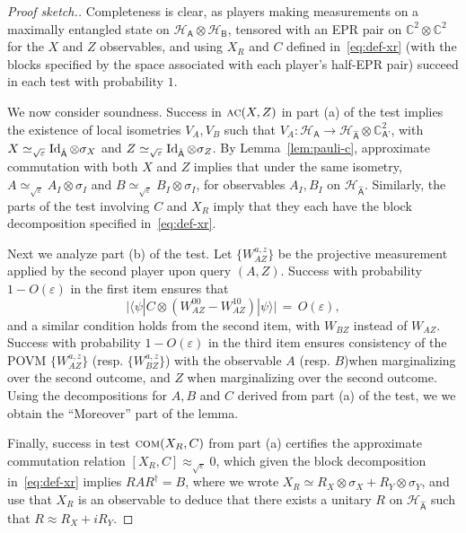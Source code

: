 \documentclass[11pt]{article}
\theoremstyle{remark}
\theoremstyle{definition}
\newcommand{\ket}[1]{|#1\rangle}
\newcommand{\bra}[1]{\langle#1|}
\newcommand{\Id}{\ensuremath{\mathop{\rm Id}\nolimits}}
\newcommand{\reg}[1]{{\textsf{#1}}}
\newcommand{\C}{\ensuremath{\mathbb{C}}}
\newcommand{\mH}{\mathcal{H}}
\newcommand{\eps}{\varepsilon}
\newcommand{\comt}{\textsc{com}}
\newcommand{\act}{\textsc{ac}}
\begin{document}
\begin{proof}[Proof sketch.]
Completeness is clear, as players making measurements on a maximally entangled state on $\mH_{\reg{A}}\otimes \mH_{\reg{B}}$, tensored with an EPR pair on $\C^2 \otimes \C^2$ for the $X$ and $Z$ observables, and using $X_R$ and $C$ defined in~\eqref{eq:def-xr} (with the blocks specified by the space associated with each player's half-EPR pair) succeed in each test with probability $1$. 

We now consider soundness. Success in $\act(X,Z)$ in part (a) of the test implies the existence of local isometries $V_A,V_B$ such that $V_A:\mH_\reg{A}\to \mH_{\hat{\reg{A}}}\otimes \C^2_{\reg{A'}}$, with $X\simeq_{\sqrt{\eps}} \Id_{\hat{\reg{A}}}\otimes \sigma_X$ and $Z\simeq_{\sqrt{\eps}} \Id_{\hat{\reg{A}}}\otimes\sigma_Z$. By Lemma~\ref{lem:pauli-c}, approximate commutation with both $X$ and $Z$ implies that under the same isometry, $A\simeq_{\sqrt{\eps}} A_I \otimes \sigma_I$ and $B\simeq_{\sqrt{\eps}} B_I \otimes \sigma_I$, for observables $A_I, B_I$ on $\mH_{\hat{\reg{A}}}$. Similarly, the parts of the test involving $C$ and $X_R$ imply that they each have the block decomposition specified in~\eqref{eq:def-xr}. 

Next we analyze part (b) of the test. Let $\{W_{AZ}^{a,z}\}$ be the projective measurement applied by the second player upon query $(A,Z)$. Success with probability $1-O(\eps)$ in the first item ensures that 
$$\big| \bra{\psi} C \otimes (W_{AZ}^{00} - W_{AZ}^{10})\ket{\psi} \big| \,=\,O(\eps),$$
and a similar condition holds from the second item, with $W_{BZ}$ instead of $W_{AZ}$. Success with probability $1-O(\eps)$ in the third item ensures consistency of the POVM $\{W_{AZ}^{a,z}\}$ (resp. $\{W_{BZ}^{a,z}\}$) with the observable $A$ (resp. $B$)when marginalizing over the second outcome, and $Z$ when marginalizing over the second outcome. Using the decompositions for $A,B$ and $C$ derived from part (a) of the test, we we obtain the ``Moreover'' part of the lemma. 

Finally, success in test $\comt(X_R,C)$ from part (a) certifies the approximate commutation relation $[X_R,C]\approx_{\sqrt{\eps}} 0$, which given the block decomposition in~\eqref{eq:def-xr} implies $RAR^\dagger = B$, where we wrote $X_R \simeq R_X \otimes \sigma_X + R_Y \otimes \sigma_Y$, and use that $X_R$ is an observable to deduce that there exists a unitary $R$ on $\mH_{\hat{\reg{A}}}$ such that $R \approx R_X + i R_Y$. 
\end{proof}
\end{document}

